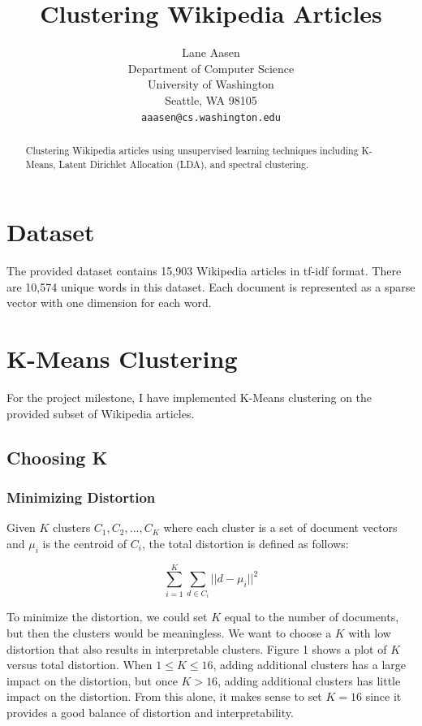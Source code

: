 \documentclass{article} %
\title{Clustering Wikipedia Articles}
\author{
Lane Aasen\\
Department of Computer Science\\
University of Washington\\
Seattle, WA 98105\\
\texttt{aaasen@cs.washington.edu}\\
}
\begin{document}
\maketitle

\begin{abstract}
Clustering Wikipedia articles using unsupervised learning techniques including K-Means, Latent Dirichlet Allocation (LDA), and spectral clustering.
\end{abstract}


\section{Dataset}

The provided dataset contains 15,903 Wikipedia articles in tf-idf format. There are 10,574 unique words in this dataset. Each document is represented as a sparse vector with one dimension for each word.

\section{K-Means Clustering}

For the project milestone, I have implemented K-Means clustering on the provided subset of Wikipedia articles.

\subsection{Choosing K}

\subsubsection{Minimizing Distortion}

Given $K$ clusters $C_{1},C_{2},...,C_{K}$ where each cluster is a set of document vectors and $\mu_{i}$ is the centroid of $C_{i}$, the total distortion is defined as follows:

$$\sum_{i=1}^{K}\sum_{d \in C_{i}} ||d - \mu_{i}||^{2}$$

To minimize the distortion, we could set $K$ equal to the number of documents, but then the clusters would be meaningless. We want to choose a $K$ with low distortion that also results in interpretable clusters. Figure 1 shows a plot of $K$ versus total distortion. When $1 \leq K \leq 16$, adding additional clusters has a large impact on the distortion, but once $K > 16$, adding additional clusters has little impact on the distortion. From this alone, it makes sense to set $K=16$ since it provides a good balance of distortion and interpretability.
\end{document}
